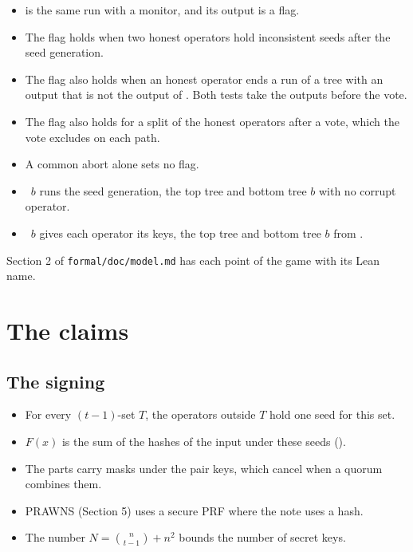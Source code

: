 \documentclass[11pt]{article}
\makeatletter
\renewcommand\paragraph{\@startsection{paragraph}{4}{\z@}{-2.25ex \@plus -.8ex \@minus -.2ex}{0.4ex}{\normalfont\normalsize\bfseries}}
\makeatother
\begin{document}
\paragraph{The other games}
\begin{itemize}
\item {} is the same run with a monitor, and its output is a flag.
\item The flag holds when two honest operators hold inconsistent seeds after the seed generation.
\item The flag also holds when an honest operator ends a run of a tree with an output that is not
the output of . Both tests take the outputs before the vote.
\item The flag also holds for a split of the honest operators after a vote, which the vote
excludes on each path.
\item A common abort alone sets no flag.
\item {}~$b$ runs the seed generation, the top tree and bottom tree $b$ with no
corrupt operator.
\item {}~$b$ gives each operator its keys, the top tree and bottom tree $b$ from
.
\end{itemize}
Section 2 of \texttt{formal/doc/model.md} has each point of the game with its Lean name.

\section{The claims}\label{sec:claims}

\subsection{The signing}\label{sec:signing}
\begin{itemize}
\item For every $(t-1)$-set $T$, the operators outside $T$ hold one seed for this set.
\item $F(x)$ is the sum of the hashes of the input under these seeds ().
\item The parts carry masks under the pair keys, which cancel when a quorum combines them.
\item PRAWNS (Section 5) uses a secure PRF where the note uses a hash.
\item The number $N=\binom n{t-1}+n^2$ bounds the number of secret keys.
\end{itemize}
\end{document}
